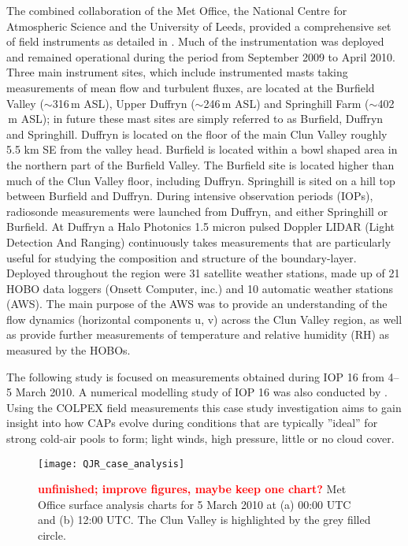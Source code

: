 \documentclass[times]{qjrms4}
\begin{document}
The combined collaboration of the Met Office, the National Centre for Atmospheric Science and the University of Leeds, provided a comprehensive set of field instruments as detailed in \citet{price2010COLPEX}. Much of the instrumentation was deployed and remained operational during the period from September 2009 to April 2010. Three main instrument sites, which include instrumented masts taking measurements of mean flow and turbulent fluxes, are located at the Burfield Valley ($\sim$316$\,\mbox{m}$ ASL), Upper Duffryn ($\sim$246$\,\mbox{m}$ ASL) and Springhill Farm ($\sim$402$\,\mbox{m}$ ASL); in future these mast sites are simply referred to as Burfield, Duffryn and Springhill. Duffryn is located on the floor of the main Clun Valley roughly 5.5 km SE from the valley head. Burfield is located within a bowl shaped area in the northern part of the Burfield Valley. The Burfield site is located higher than much of the Clun Valley floor, including Duffryn. Springhill is sited on a hill top between Burfield and Duffryn. During intensive observation periods (IOPs), radiosonde measurements were launched from Duffryn, and either Springhill or Burfield. At Duffryn a Halo Photonics 1.5 micron pulsed Doppler LIDAR (Light Detection And Ranging) continuously takes measurements that are particularly useful for studying the composition and structure of the boundary-layer. Deployed throughout the region were 31 satellite weather stations, made up of 21 HOBO data loggers (Onsett Computer, inc.) and 10 automatic weather stations (AWS). The main purpose of the AWS was to provide an understanding of the flow dynamics (horizontal components u, v) across the Clun Valley region, as well as provide further measurements of temperature and relative humidity (RH) as measured by the HOBOs.

The following study is focused on measurements obtained during IOP 16 from 4--5 March 2010. A numerical modelling study of IOP 16 was also conducted by \citet{Vosper2013narrow}. Using the COLPEX field measurements this case study investigation aims to gain insight into how CAPs evolve during conditions that are typically ''ideal'' for strong cold-air pools to form; light winds, high pressure, little or no cloud cover.
        \begin{figure}
        \centering
        \texttt{[image: QJR\_case\_analysis]}
        \caption{\textcolor{red}{\bf unfinished; improve figures, maybe keep one chart?} Met Office surface analysis charts for 5 March 2010 at (a) 00:00 UTC and (b) 12:00 UTC. The Clun Valley is highlighted by the grey filled circle.}
        \label{fig:metcharts}
        \end{figure}
        
\end{document}
